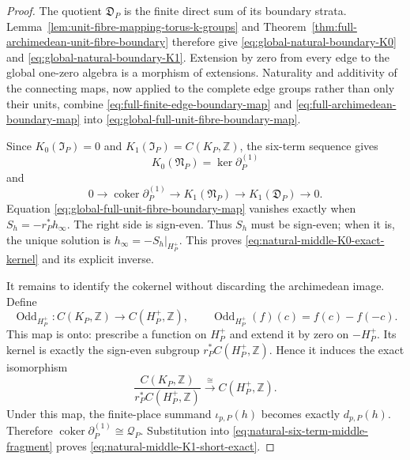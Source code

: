 \begin{proof}
The quotient \(\mathfrak D_P\) is the finite direct sum of its boundary
strata.  Lemma~\ref{lem:unit-fibre-mapping-torus-k-groups} and
Theorem~\ref{thm:full-archimedean-unit-fibre-boundary} therefore give
\eqref{eq:global-natural-boundary-K0} and
\eqref{eq:global-natural-boundary-K1}.  Extension by zero from every edge to
the global one-zero algebra is a morphism of extensions.  Naturality and
additivity of the connecting maps, now applied to the complete edge groups
rather than only their units, combine
\eqref{eq:full-finite-edge-boundary-map} and
\eqref{eq:full-archimedean-boundary-map} into
\eqref{eq:global-full-unit-fibre-boundary-map}.

Since \(K_0(\mathfrak I_P)=0\) and
\(K_1(\mathfrak I_P)=C(K_P,\mathbb Z)\), the six-term sequence gives
\[
 K_0(\mathfrak N_P)=\ker\partial_P^{(1)}
\]
and
\begin{equation}
 0\to\operatorname{coker}\partial_P^{(1)}
 \to K_1(\mathfrak N_P)
 \to K_1(\mathfrak D_P)\to0.
 \label{eq:natural-six-term-middle-fragment}
\end{equation}
Equation \eqref{eq:global-full-unit-fibre-boundary-map} vanishes exactly when
\(S_h=-r_P^*h_\infty\).  The right side is sign-even.  Thus \(S_h\) must be
sign-even; when it is, the unique solution is
\(h_\infty=-S_h|_{H_P^+}\).  This proves
\eqref{eq:natural-middle-K0-exact-kernel} and its explicit inverse.

It remains to identify the cokernel without discarding the archimedean image.
Define
\begin{equation}
 \operatorname{Odd}_{H_P^+}:C(K_P,\mathbb Z)
 \longrightarrow C(H_P^+,\mathbb Z),
 \qquad
 \operatorname{Odd}_{H_P^+}(f)(c)=f(c)-f(-c).
 \label{eq:odd-difference-quotient-map}
\end{equation}
This map is onto: prescribe a function on \(H_P^+\) and extend it by zero on
\(-H_P^+\).  Its kernel is exactly the sign-even subgroup
\(r_P^*C(H_P^+,\mathbb Z)\).  Hence it induces the exact isomorphism
\[
 \frac{C(K_P,\mathbb Z)}{r_P^*C(H_P^+,\mathbb Z)}
 \xrightarrow{\ \cong\ }C(H_P^+,\mathbb Z).
\]
Under this map, the finite-place summand \(\iota_{p,P}(h)\) becomes exactly
\(d_{p,P}(h)\).  Therefore
\(\operatorname{coker}\partial_P^{(1)}\cong\mathcal Q_P\).  Substitution into
\eqref{eq:natural-six-term-middle-fragment} proves
\eqref{eq:natural-middle-K1-short-exact}.
\end{proof}

